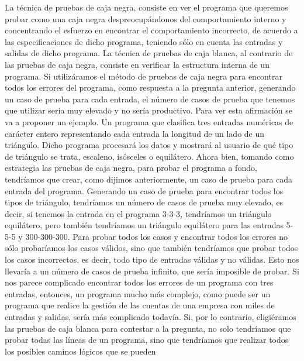 \documentclass[12pt,letterpaper]{article}
\begin{document}
La técnica de pruebas de caja negra, consiste en ver el programa que queremos probar como una caja negra despreocupándonos del comportamiento interno y concentrando el esfuerzo en encontrar el comportamiento incorrecto, de acuerdo a las especificaciones de dicho programa, teniendo sólo en cuenta las entradas y salidas de dicho programa.
La técnica de pruebas de caja blanca, al contrario de las pruebas de caja negra, consiste en verificar la estructura interna de un programa.
Si utilizáramos el método de pruebas de caja negra para encontrar todos los errores del programa, como respuesta a la pregunta anterior, generando un caso de prueba para cada entrada, el número de casos de prueba que tenemos que utilizar sería muy elevado y no sería productivo. Para ver esta afirmación se va a proponer un ejemplo. Un programa que clasifica tres entradas numéricas de carácter entero representando cada entrada la longitud de un lado de un triángulo. Dicho programa procesará los datos y mostrará al usuario de qué tipo de triángulo se trata, escaleno, isósceles o equilátero. Ahora bien, tomando como estrategia las pruebas de caja negra, para probar el programa a fondo, tendríamos que crear, como dijimos anteriormente, un caso de prueba para cada entrada del programa. Generando un caso de prueba para encontrar todos los tipos de triángulo, tendríamos un número de casos de prueba muy elevado, es decir, si tenemos la entrada en el programa 3-3-3, tendríamos un triángulo equilátero, pero también tendríamos un triángulo equilátero para las entradas 5-5-5 y 300-300-300. Para probar todos los casos y encontrar todos los errores no sólo probaríamos los casos válidos, sino que también tendríamos que probar todos los casos incorrectos, es decir, todo tipo de entradas válidas y no válidas. Esto nos llevaría a un número de casos de prueba infinito, que sería imposible de probar. Si nos parece complicado encontrar todos los errores de un programa con tres entradas, entonces, un programa mucho más complejo, como puede ser un programa que realice la gestión de las cuentas de una empresa con miles de entradas y salidas, sería más complicado todavía.
Si, por lo contrario, eligiéramos las pruebas de caja blanca para contestar a la pregunta, no solo tendríamos que probar todas las líneas de un programa, sino que tendríamos que realizar todos los posibles caminos lógicos que se pueden
 
\end{document}
